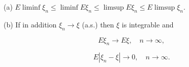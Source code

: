 (a) $E \liminf \xi_n \leq \liminf E\xi_n \leq \limsup E\xi_n \leq E \limsup \xi_n$.

(b) If in addition $\xi_n \to \xi$ (a.s.) then $\xi$ is integrable and

$$E\xi_n \to E\xi, \quad n \to \infty,$$

$$E|\xi_n - \xi| \to 0, \quad n \to \infty.$$
